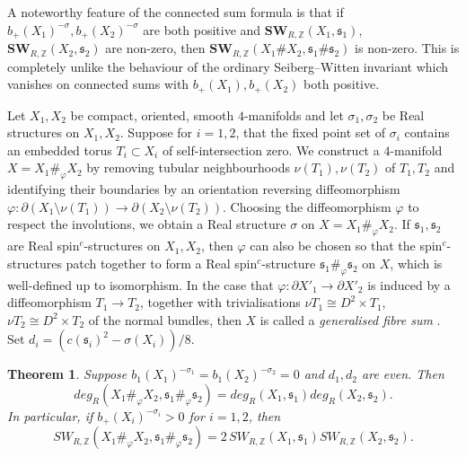 \documentclass{amsart}
\newtheorem{theorem}{Theorem}[section]
\theoremstyle{definition}
\theoremstyle{remark}
\numberwithin{equation}{section}
\begin{document}
A noteworthy feature of the connected sum formula is that if $b_+(X_1)^{-\sigma}, b_+(X_2)^{-\sigma}$ are both positive and $\mathbf{SW}_{R,\mathbb{Z}}(X_1 , \mathfrak{s}_1)$, $\mathbf{SW}_{R,\mathbb{Z}}(X_2, \mathfrak{s}_2)$ are non-zero, then \linebreak $\mathbf{SW}_{R,\mathbb{Z}}(X_1 \# X_2 , \mathfrak{s}_1 \# \mathfrak{s}_2)$ is non-zero. This is completely unlike the behaviour of the ordinary Seiberg--Witten invariant which vanishes on connected sums with $b_+(X_1) , b_+(X_2)$ both positive.



 Let $X_1,X_2$ be compact, oriented, smooth $4$-manifolds and let $\sigma_1,\sigma_2$ be Real structures on $X_1,X_2$. Suppose for $i=1,2$, that the fixed point set of $\sigma_i$ contains an embedded torus $T_i \subset X_i$ of self-intersection zero. We construct a $4$-manifold $X = X_1 \#_{\varphi} X_2$ by removing tubular neighbourhoods $\nu(T_1), \nu(T_2)$ of $T_1,T_2$ and identifying their boundaries by an orientation reversing diffeomorphism $\varphi : \partial(X_1 \setminus \nu(T_1)) \to \partial( X_2 \setminus \nu(T_2))$. Choosing the diffeomorphism $\varphi$ to respect the involutions, we obtain a Real structure $\sigma$ on $X = X_1 \#_\varphi X_2$. If $\mathfrak{s}_1, \mathfrak{s}_2$ are Real spin$^c$-structures on $X_1,X_2$, then $\varphi$ can also be chosen so that the spin$^c$-structures patch together to form a Real spin$^c$-structure $\mathfrak{s}_1 \#_\varphi \mathfrak{s}_2$ on $X$, which is well-defined up to isomorphism. In the case that $\varphi : \partial X'_1 \to \partial X'_2$ is induced by a diffeomorphism $T_1 \to T_2$, together with trivialisations $\nu T_1 \cong D^2 \times T_1$, $\nu T_2 \cong D^2 \times T_2$ of the normal bundles, then $X$ is called a {\em generalised fibre sum} \cite[Definition 7.1.11]{gs}. Set $d_i = (c(\mathfrak{s}_i)^2 - \sigma(X_i))/8$.

\begin{theorem}
Suppose $b_1(X_1)^{-\sigma_1} = b_1(X_2)^{-\sigma_2} = 0$ and $d_1, d_2$ are even. Then
\[
deg_R(X_1 \#_\varphi X_2 , \mathfrak{s}_1 \#_\varphi \mathfrak{s}_2) = deg_R(X_1 ,\mathfrak{s}_1) deg_R(X_2 , \mathfrak{s}_2).
\]
In particular, if $b_+(X_i)^{-\sigma_i} > 0$ for $i=1,2$, then
\[
SW_{R,\mathbb{Z}}( X_1 \#_\varphi X_2 , \mathfrak{s}_1 \#_\varphi \mathfrak{s}_2 ) = 2 \, SW_{R,\mathbb{Z}}(X_1 , \mathfrak{s}_1) SW_{R,\mathbb{Z}}(X_2 ,\mathfrak{s}_2).
\]
\end{theorem}
\end{document}
